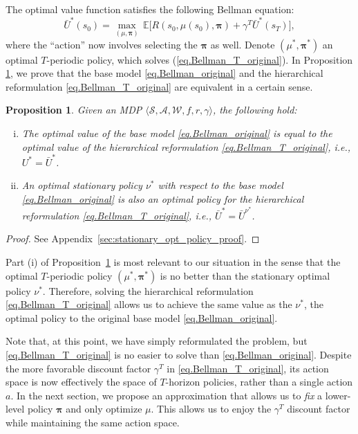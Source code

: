 \documentclass[11pt, notitlepage]{article}
\newcommand{\E}{\mathbb{E}}
\newcommand{\1}{\mathbbm{1}}
\newtheorem{proposition}{Proposition}[section]
\begin{document}
The optimal value function satisfies the following Bellman equation:
\begin{equation} \label{eq.Bellman_T_original}
    \bar{U}^*(s_0) 
    =\max_{(\mu, \boldsymbol{\pi})} \, \E \bigl[ R(s_0, \mu(s_0), \boldsymbol{\pi}) + \gamma^T \bar{U}^*(s_T) \bigr],
\end{equation}
where the ``action'' now involves selecting the $\boldsymbol{\pi}$ as well.
Denote $(\mu^*,\boldsymbol{\pi}^*)$ an optimal $T$-periodic policy, which solves (\ref{eq.Bellman_T_original}).
In Proposition \ref{thm:stationary_opt_policy}, we prove that the base model \eqref{eq.Bellman_original} and the hierarchical reformulation \eqref{eq.Bellman_T_original} are equivalent in a certain sense.

\begin{proposition}
\label{thm:stationary_opt_policy}
    Given an MDP $\langle \mathcal{S}, \mathcal{A}, \mathcal{W}, f, r, \gamma \rangle$, the following hold:
    \begin{enumerate}[(i)]
        \item The optimal value of the base model \eqref{eq.Bellman_original} is equal to the optimal value of the hierarchical reformulation \eqref{eq.Bellman_T_original}, i.e., $U^* = \bar{U}^*$.
        \item An optimal stationary policy $\nu^*$ with respect to the base model \eqref{eq.Bellman_original} is also an optimal policy for the hierarchical reformulation \eqref{eq.Bellman_T_original}, i.e., $\bar{U}^* = \bar{U}^{\nu^*}$.
    \end{enumerate}
\end{proposition}
\begin{proof}
See Appendix~\ref{sec:stationary_opt_policy_proof}.
\end{proof}
 Part (i) of Proposition~\ref{thm:stationary_opt_policy} is most relevant to our situation in the sense that the optimal $T$-periodic policy $(\mu^*,\boldsymbol{\pi}^*)$ is no better than the stationary optimal policy $\nu^*$. Therefore, solving the hierarchical reformulation \eqref{eq.Bellman_T_original} allows us to achieve the same value as the $\nu^*$, the optimal policy to the original base model \eqref{eq.Bellman_original}.

Note that, at this point, we have simply reformulated the problem, but \eqref{eq.Bellman_T_original} is no easier to solve than \eqref{eq.Bellman_original}. Despite the more favorable discount factor $\gamma^T$ in \eqref{eq.Bellman_T_original}, its action space is now effectively the space of $T$-horizon policies, rather than a single action $a$. In the next section, we propose an approximation that allows us to \emph{fix} a lower-level policy $\boldsymbol{\pi}$ and only optimize $\mu$. This allows us to enjoy the $\gamma^T$ discount factor while maintaining the same action space.
\end{document}
